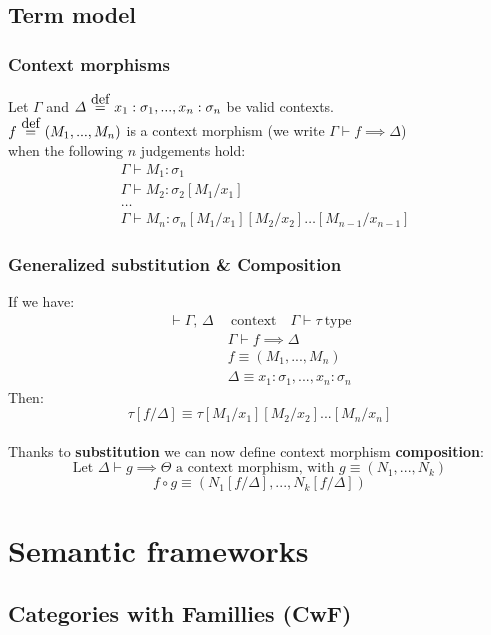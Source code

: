 \documentclass[aspectratio=169]{beamer}
\newcommand{\cntxt}{\ \mathrm{context}}
\newcommand{\typ}{\ \mathrm{type}}
\newcommand\defeq{\stackrel{\mathclap{\normalfont\mbox{def}}}{\ =\ }}
\newcommand{\Gamdash}{\Gamma\vdash}
\newcommand{\xsigmas}{x_1:\sigma_1, ..., x_n:\sigma_n}
\begin{document}
    \subsection{Term model}
    \begin{frame}
        \frametitle{Context morphisms}
        Let $\Gamma$ and $\Delta \defeq x_1:\sigma_1,...,x_n:\sigma_n$ be valid contexts.\\
        $f \defeq (M_1,...,M_n)$ is a context morphism (we write $\Gamdash f \implies \Delta$)\\
        when the following $n$ judgements hold:
        \begin{align*}
            &\Gamdash M_1:\sigma_1\\
            &\Gamdash M_2:\sigma_2[M_1/x_1]\\
            &\dots\\
            &\Gamdash M_n:\sigma_n[M_1/x_1][M_2/x_2]\dots[M_{n-1}/x_{n-1}]
        \end{align*}
    \end{frame}

    \begin{frame}
        \frametitle{Generalized substitution \& Composition}
        If we have:
        \begin{align*}
            \vdash \Gamma,\,\Delta\ &\cntxt\quad\Gamdash \tau \typ\\
            &\Gamdash f \implies \Delta\\
            &f \equiv (M_1, ..., M_n)\\
            &\Delta \equiv \xsigmas
        \end{align*}
        Then:
        $$\tau[f\slash\Delta]\equiv\tau[M_1\slash x_1][M_2\slash x_2]...[M_n\slash x_n]$$
        \vspace{8pt}\\
        Thanks to \textbf{substitution} we can now define context morphism \textbf{composition}:
        $$\text{Let }\Delta\vdash g\implies\Theta\text{ a context morphism, with }g\equiv(N_1,...,N_k)$$
        $$f \circ g\equiv(N_1[f\slash\Delta],...,N_k[f\slash\Delta])$$
    \end{frame}

    \section{Semantic frameworks}
    \subsection{Categories with Famillies (CwF)}
\end{document}
